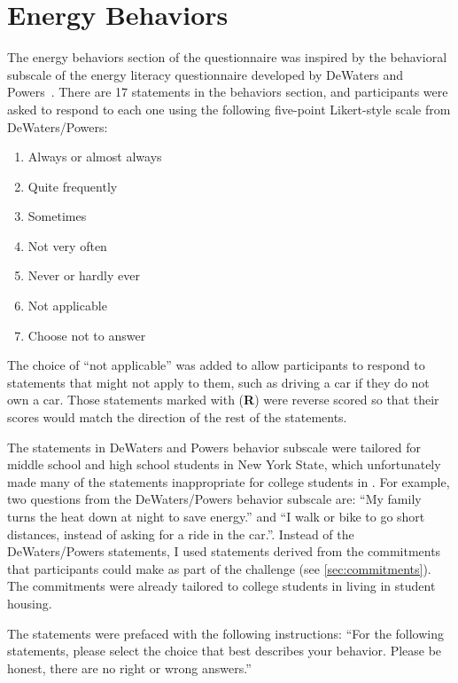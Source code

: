 \section{Energy Behaviors}
\label{sec:behavior-items}

The energy behaviors section of the questionnaire was inspired by the behavioral subscale of the energy literacy questionnaire developed by DeWaters and Powers~\cite{DeWaters2011}. There are 17 statements in the behaviors section, and participants were asked to respond to each one using the following five-point Likert-style scale from DeWaters/Powers:

\begin{enumerate}
	\item Always or almost always
	\item Quite frequently
	\item Sometimes
	\item Not very often
	\item Never or hardly ever
	\item Not applicable
	\item Choose not to answer
\end{enumerate}

The choice of ``not applicable'' was added to allow participants to respond to statements that might not apply to them, such as driving a car if they do not own a car. Those statements marked with (\textbf{R}) were reverse scored so that their scores would match the direction of the rest of the statements.

The statements in DeWaters and Powers behavior subscale were tailored for middle school and high school students in New York State, which unfortunately made many of the statements inappropriate for college students in \Hawaii. For example, two questions from the DeWaters/Powers behavior subscale are: ``My family turns the heat down at night to save energy.'' and ``I walk or bike to go short distances, instead of asking for a ride in the car.''. Instead of the DeWaters/Powers statements, I used statements derived from the commitments that participants could make as part of the challenge (see \autoref{sec:commitments}). The commitments were already tailored to college students in \Hawaii living in student housing. 

The statements were prefaced with the following instructions: ``For the following statements, please select the choice that best describes your behavior. Please be honest, there are no right or wrong answers.''

